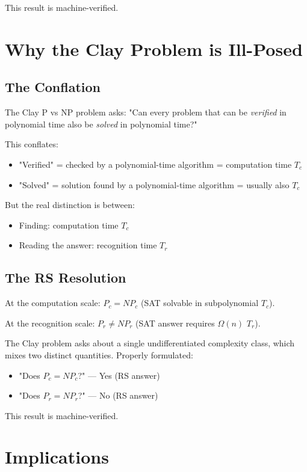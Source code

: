 \documentclass[12pt,a4paper]{article}
\theoremstyle{definition}
\theoremstyle{remark}
\begin{document}
This result is machine-verified.

\section{Why the Clay Problem is Ill-Posed}

\subsection{The Conflation}

The Clay P vs NP problem asks: "Can every problem that can be \emph{verified} 
in polynomial time also be \emph{solved} in polynomial time?"

This conflates:
\begin{itemize}
\item "Verified" = checked by a polynomial-time algorithm = computation time $T_c$
\item "Solved" = solution found by a polynomial-time algorithm = usually also $T_c$
\end{itemize}

But the real distinction is between:
\begin{itemize}
\item Finding: computation time $T_c$
\item Reading the answer: recognition time $T_r$
\end{itemize}

\subsection{The RS Resolution}

At the computation scale: $P_c = NP_c$ (SAT solvable in subpolynomial $T_c$).

At the recognition scale: $P_r \neq NP_r$ (SAT answer requires $\Omega(n)$ $T_r$).

The Clay problem asks about a single undifferentiated complexity class, 
which mixes two distinct quantities. Properly formulated:
\begin{itemize}
\item "Does $P_c = NP_c$?" — Yes (RS answer)
\item "Does $P_r = NP_r$?" — No (RS answer)
\end{itemize}

This result is machine-verified.

\section{Implications}
\end{document}
